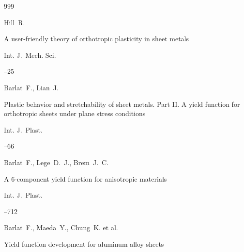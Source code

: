 \begin{thebibliography}{999}





\by Hill~R. 

\paper A user-friendly theory of orthotropic plasticity in sheet metals

\jour  Int. J.~Mech. Sci.




–25






\by Barlat~F., Lian~J.

\paper Plastic behavior and stretchability of sheet metals. Part II. A yield function for orthotropic sheets under plane stress conditions

\jour Int. J.~Plast.




--66






\by Barlat~F., Lege~D.~J., Brem~J.~C.

\paper A 6-component yield function for anisotropic materials

\jour Int. J.~Plast.




--712






\by Barlat~F., Maeda~Y., Chung~K. et al.

\paper Yield function development for aluminum alloy sheets


\end{thebibliography}
